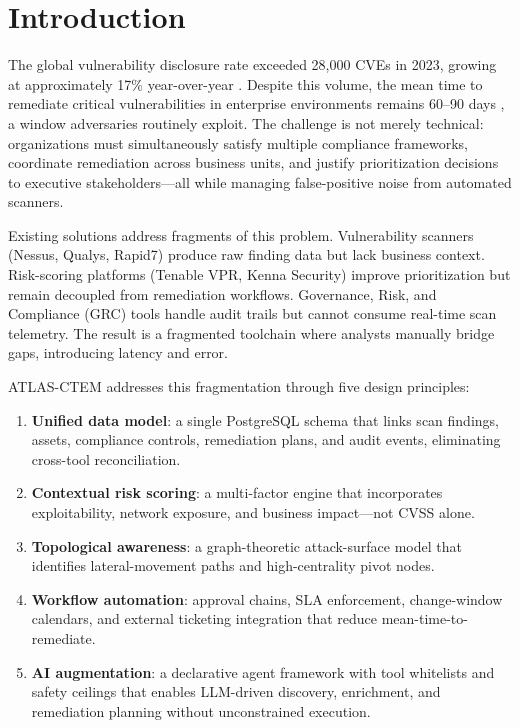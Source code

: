 \documentclass[conference]{IEEEtran}
\begin{document}
\section{Introduction}

The global vulnerability disclosure rate exceeded 28,000 CVEs in 2023, growing at approximately 17\% year-over-year \cite{nvd2023}. Despite this volume, the mean time to remediate critical vulnerabilities in enterprise environments remains 60–90 days \cite{kenna2022}, a window adversaries routinely exploit. The challenge is not merely technical: organizations must simultaneously satisfy multiple compliance frameworks, coordinate remediation across business units, and justify prioritization decisions to executive stakeholders—all while managing false-positive noise from automated scanners.

Existing solutions address fragments of this problem. Vulnerability scanners (Nessus, Qualys, Rapid7) produce raw finding data but lack business context. Risk-scoring platforms (Tenable VPR, Kenna Security) improve prioritization but remain decoupled from remediation workflows. Governance, Risk, and Compliance (GRC) tools handle audit trails but cannot consume real-time scan telemetry. The result is a fragmented toolchain where analysts manually bridge gaps, introducing latency and error.

ATLAS-CTEM addresses this fragmentation through five design principles:

\begin{enumerate}
  \item \textbf{Unified data model}: a single PostgreSQL schema that links scan findings, assets, compliance controls, remediation plans, and audit events, eliminating cross-tool reconciliation.
  \item \textbf{Contextual risk scoring}: a multi-factor engine that incorporates exploitability, network exposure, and business impact—not CVSS alone.
  \item \textbf{Topological awareness}: a graph-theoretic attack-surface model that identifies lateral-movement paths and high-centrality pivot nodes.
  \item \textbf{Workflow automation}: approval chains, SLA enforcement, change-window calendars, and external ticketing integration that reduce mean-time-to-remediate.
  \item \textbf{AI augmentation}: a declarative agent framework with tool whitelists and safety ceilings that enables LLM-driven discovery, enrichment, and remediation planning without unconstrained execution.
\end{enumerate}
\end{document}
